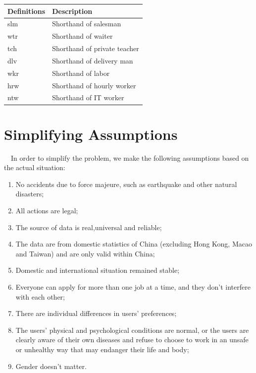 \documentclass[12pt]{article}
\begin{document}
\begin{table}
    \begin{tabular*}{15cm}{ll}
        \hline
        Definitions & Description\\
        \hline
        slm & Shorthand of salesman\\
        wtr & Shorthand of waiter\\
        tch & Shorthand of private teacher\\
        dlv & Shorthand of delivery man\\
        wkr & Shorthand of labor\\
        hrw & Shorthand of hourly worker\\
        ntw & Shorthand of IT worker\\ 
    \end{tabular*}
\end{table}

\section{Simplifying Assumptions}
~~In order to simplify the problem, we make the following assumptions based on the actual situation:
~~
\begin{enumerate}
    \item No accidents due to force majeure, such as earthquake and other natural disasters;
    \item All actions are legal;
    \item The source of data is real,universal and reliable;
    \item The data are from domestic statistics of China (excluding Hong Kong, Macao and Taiwan) and are only valid within China;
    \item Domestic and international situation remained stable;
    \item Everyone can apply for more than one job at a time, and they don't interfere with each other;
    \item There are individual differences in users' preferences;
    \item The users' physical and psychological conditions are normal, or the users are clearly aware of their own diseases and refuse to choose to work in an unsafe or unhealthy way that may endanger their life and body;
    \item Gender doesn't matter.
\end{enumerate}
\end{document}
